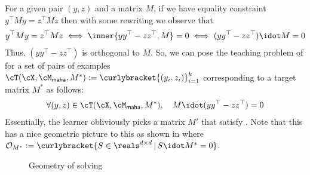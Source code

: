 For a given pair $(y,z)$ and a matrix $M$, if we have equality constraint $y^{\top}My = z^{\top}Mz$ then with some rewriting we observe that
\begin{align*}
    y^{\top}My = z^{\top}Mz \iff \inner{yy^{\top} - zz^{\top}, M} = 0 \iff (yy^{\top} - zz^{\top}) \idot M = 0
\end{align*}
Thus, $(yy^{\top} - zz^{\top})$ is orthogonal to $M$. So, we can pose the teaching problem of  for a set of pairs of examples $\cT(\cX,\cM_{\textsf{maha}},M^*) := \curlybracket{(y_i,z_i)}_{i=1}^k $ corresponding to a target matrix $M^*$ as follows:
\begin{align}
  \forall (y,z) \in \cT(\cX,\cM_{\textsf{maha}},M^*), \quad M \idot (yy^{\top} - zz^{\top})  = 0 \label{eq: orthosat}
\end{align}
Essentially, the learner obliviously picks a matrix $M'$ that satisfy . Note that this has a nice geometric picture to this as shown in  where $\mathcal{O}_{M^*} := \curlybracket{S \in \reals^{d \times d} \,|\, S\idot M^* = 0}$.
\begin{figure}
\begin{center}

\end{center}
\caption{Geometry of solving }
    \label{fig: geom}
\end{figure}


